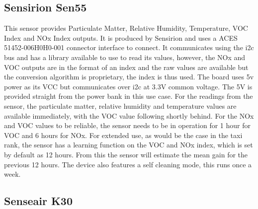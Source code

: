 \subsection{Sensirion Sen55}
This sensor provides Particulate Matter, Relative Humidity, Temperature, VOC Index and NOx Index outputs.
It is produced by Sensirion and uses a ACES 51452-006H0H0-001 connector interface to connect. It communicates using the i2c bus and has a library available to use to read its values, however, the NOx and VOC outputs are in the format of an index and the raw values are available but the conversion algorithm is proprietary, the index is thus used. The board uses 5v power as its VCC but communicates over i2c at 3.3V common voltage. The 5V is provided straight from the power bank in this use case.
For the readings from the sensor, the particulate matter, relative humidity and temperature values are available immediately, with the VOC value following shortly behind. For the NOx and VOC values to be reliable, the sensor needs to be in operation for 1 hour for VOC and 6 hours for NOx. For extended use, as would be the case in the taxi rank, the sensor has a learning function on the VOC and NOx index, which is set by default as 12 hours. From this the sensor will estimate the mean gain for the previous 12 hours. The device also features a self cleaning mode, this runs once a week.


\subsection{Senseair K30}





%
%
%
%

